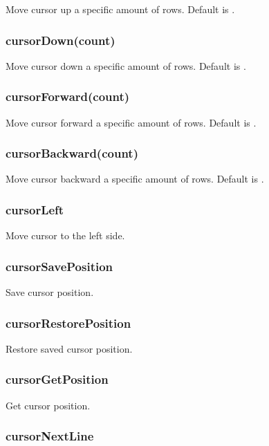 Move cursor up a specific amount of rows. Default is {}.

\subsubsection*{cursor\+Down(count)}

Move cursor down a specific amount of rows. Default is {}.

\subsubsection*{cursor\+Forward(count)}

Move cursor forward a specific amount of rows. Default is {}.

\subsubsection*{cursor\+Backward(count)}

Move cursor backward a specific amount of rows. Default is {}.

\subsubsection*{cursor\+Left}

Move cursor to the left side.

\subsubsection*{cursor\+Save\+Position}

Save cursor position.

\subsubsection*{cursor\+Restore\+Position}

Restore saved cursor position.

\subsubsection*{cursor\+Get\+Position}

Get cursor position.

\subsubsection*{cursor\+Next\+Line}

